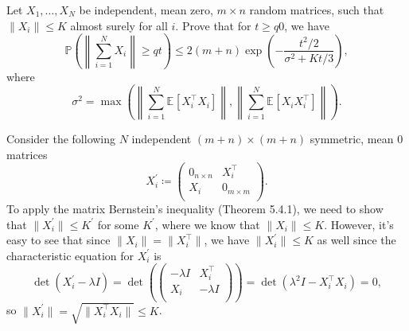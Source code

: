 \begin{problem*}[Exercise 5.4.15]\label{ex5.4.15}
	Let \(X_1, \dots , X_N\) be independent, mean zero, \(m \times n\) random matrices, such that \(\lVert X_i \rVert \leq K\) almost surely for all \(i\). Prove that for \(t \geq q 0\), we have
	\[
		\mathbb{P} \left( \left\lVert \sum_{i=1}^{N} X_i \right\rVert \geq q t \right)
		\leq 2 (m+n) \exp (- \frac{t^2 / 2}{\sigma ^2 + Kt / 3}),
	\]
	where
	\[
		\sigma ^2
		= \max \left( \left\lVert \sum_{i=1}^{N} \mathbb{E}_{}[X_i ^{\top} X_i] \right\rVert , \left\lVert \sum_{i=1}^{N} \mathbb{E}_{}[X_i X_i ^{\top} ] \right\rVert \right) .
	\]
\end{problem*}
\begin{answer}
	Consider the following \(N\) independent \((m+n) \times (m+n)\) symmetric, mean \(0\) matrices
	\[
		X_i^{\prime} \coloneqq \begin{pmatrix}
			0_{n\times n} & X_i ^{\top}    \\
			X_i           & 0_{m \times m} \\
		\end{pmatrix}.
	\]
	To apply the matrix Bernstein's inequality (Theorem 5.4.1), we need to show that \(\lVert X_i ^{\prime} \rVert \leq K^{\prime} \) for some \(K^{\prime} \), where we know that \(\lVert X_i \rVert \leq K\). However, it's easy to see that since \(\lVert X_i \rVert = \lVert X_i ^{\top} \rVert \), we have \(\lVert X_i^{\prime} \rVert \leq K\) as well since the characteristic equation for \(X_i ^{\prime} \) is
	\[
		\det (X_i^{\prime} - \lambda I)
		= \det (\begin{pmatrix}
				-\lambda I & X_i ^{\top} \\
				X_i        & -\lambda I  \\
			\end{pmatrix} )
		= \det (\lambda ^2 I - X_i ^{\top} X_i)
		= 0,
	\]
	so \(\lVert X_i^{\prime} \rVert = \sqrt{\lVert X_i ^{\top} X_i \rVert } \leq K\).


\end{answer}
